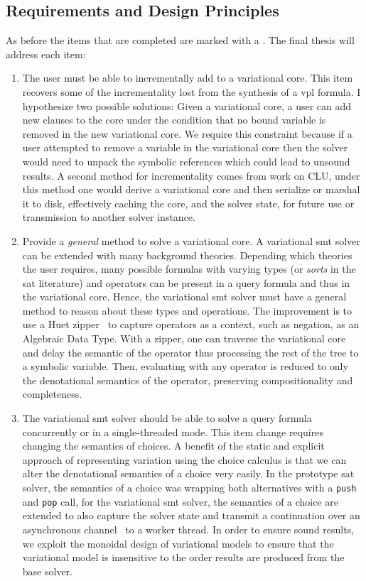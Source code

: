 \subsection{Requirements and Design Principles}
As before the items that are completed are marked with a \checkmark{}. The final
thesis will address each item:
\begin{enumerate}
\item The user must be able to incrementally add to a variational core. This
  item recovers some of the incrementality lost from the synthesis of a \ac{vpl}
  formula. I hypothesize two possible solutions: Given a variational core, a
  user can add new clauses to the core under the condition that no bound
  variable is removed in the new variational core. We require this constraint
  because if a user attempted to remove a variable in the variational core then
  the solver would need to unpack the symbolic references which could lead to
  unsound results. A second method for incrementality comes from work on
  CLU\cite{10.1145/69622.357182}, under this method one would derive a
  variational core and then serialize or marshal it to disk, effectively caching
  the core, and the solver state, for future use or transmission to another
  solver instance.
\item \checkmark{} Provide a \emph{general} method to solve a variational core.
  A variational \ac{smt} solver can be extended with many background theories.
  Depending which theories the user requires, many possible formulas with
  varying types (or \emph{sorts} in the \ac{sat} literature) and operators can
  be present in a query formula and thus in the variational core. Hence, the
  variational \ac{smt} solver must have a general method to reason about these
  types and operations. The improvement is to use a Huet zipper~\cite{huet_1997}
  to capture operators as a context, such as negation, as an Algebraic Data
  Type. With a zipper, one can traverse the variational core and delay the
  semantic of the operator thus processing the rest of the tree to a symbolic
  variable. Then, evaluating with any operator is reduced to only the
  denotational semantics of the operator, preserving compositionality and
  completeness.
\item \checkmark{} The variational \ac{smt} solver should be able to solve a
  query formula concurrently or in a single-threaded mode. This item change
  requires changing the semantics of choices. A benefit of the static and
  explicit approach of representing variation using the choice calculus is that
  we can alter the denotational semantics of a choice very easily. In the
  prototype \ac{sat} solver, the semantics of a choice was wrapping both
  alternatives with a \texttt{push} and \texttt{pop} call, for the variational
  \ac{smt} solver, the semantics of a choice are extended to also capture the
  solver state and transmit a continuation over an asynchronous
  channel~\cite{Marlow2012} to a worker thread. In order to ensure sound
  results, we exploit the monoidal design of variational models to ensure that
  the variational model is insensitive to the order results are produced from
  the base solver.
\end{enumerate}

